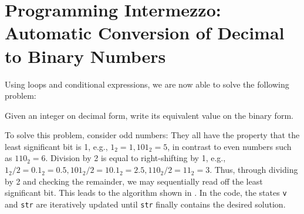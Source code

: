 \documentclass[fsharpNotes.tex]{subfiles}
\begin{document}
\clearpage

\section{Programming Intermezzo: Automatic Conversion of Decimal to Binary Numbers}
Using loops and conditional expressions, we are now able to solve the following problem:
\begin{task}
  Given an integer on decimal form, write its equivalent value on the binary form.
\end{task}
To solve this problem, consider odd numbers: They all have the property that the least significant bit is 1, e.g., $1_2 = 1, 101_2 = 5$, in contrast to even numbers such as $110_2 = 6$. Division by 2 is equal to right-shifting by 1, e.g., $1_2/2 = 0.1_2 = 0.5, 101_2/2 = 10.1_2 = 2.5, 110_2/2 = 11_2 = 3$. Thus, through dividing by 2 and checking the remainder, we may sequentially read off the least significant bit. This leads to the algorithm shown in .
%
%
In the code, the states \lstinline!v! and \lstinline!str! are iteratively updated until \lstinline!str! finally contains the desired solution.
\end{document}
